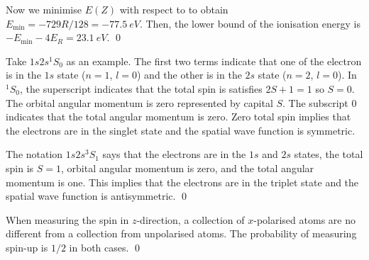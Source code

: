 \documentclass[12pt]{article}
\begin{document}
Now we minimise $E(Z)$ with respect to to obtain $E_{\text{min}} = -729R/128 = -\qty{77.5}{eV}$. Then, the lower bound of the ionisation energy is $-E_{\text{min}} - 4E_{R} = \qty{23.1}{eV}$.
\qed


Take $1s2s^{1}S_{0}$ as an example. The first two terms indicate that one of the electron is in the $1s$ state ($n = 1$, $l = 0$) and the other is in the $2s$ state ($n = 2$, $l = 0$). In $^{1}S_{0}$, the superscript indicates that the total spin is satisfies $2S + 1 = 1$ so $S = 0$. The orbital angular momentum is zero represented by capital $S$. The subscript $0$ indicates that the total angular momentum is zero. Zero total spin implies that the electrons are in the singlet state and the spatial wave function is symmetric.

The notation $1s2s^{3}S_{1}$ says that the electrons are in the $1s$ and $2s$ states, the total spin is $S = 1$, orbital angular momentum is zero, and the total angular momentum is one. This implies that the electrons are in the triplet state and the spatial wave function is antisymmetric.
\qed


When measuring the spin in $z$-direction, a collection of $x$-polarised atoms are no different from a collection from unpolarised atoms. The probability of measuring spin-up is $1/2$ in both cases.
\qed
\end{document}
